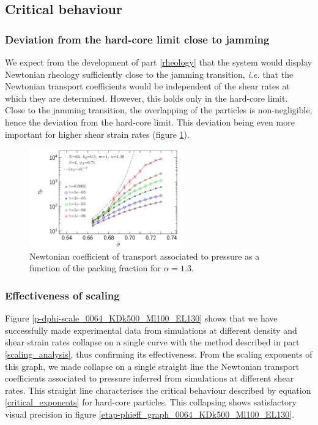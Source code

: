 \documentclass[class=report, float=false, crop=false]{standalone}
\begin{document}
\subsection{Critical behaviour}

\subsubsection{Deviation from the hard-core limit close to jamming}
\label{deviation_hard-core_limit}

We expect from the development of part \ref{rheology} that the system would display Newtonian rheology sufficiently close to the jamming transition, \textit{i.e.} that the Newtonian transport coefficients would be independent of the shear rates at which they are determined. However, this holds only in the hard-core limit.\\

Close to the jamming transition, the overlapping of the particles is non-negligible, hence the deviation from the hard-core limit. This deviation being even more important for higher shear strain rates (figure \ref{etap-phi_0064_KDk500_Ml100_EL130}).

\begin{figure}[h!]
\centering
\includegraphics[width=0.6\textwidth]{figures/figs/etap-phi_0064_KDk500_Ml100_EL130}
\caption{Newtonian coefficient of transport associated to pressure as a function of the packing fraction for $\alpha=1.3$.}
\label{etap-phi_0064_KDk500_Ml100_EL130}
\end{figure}

\subsubsection{Effectiveness of scaling}

Figure \ref{p-dphi-scale_0064_KDk500_Ml100_EL130} shows that we have successfully made experimental data from simulations at different density and shear strain rates collapse on a single curve with the method described in part \ref{scaling_analysis}, thus confirming its effectiveness. From the scaling exponents of this graph, we made collapse on a single straight line the Newtonian transport coefficients associated to pressure inferred from simulations at different shear rates. This straight line characterises the critical behaviour described by equation \ref{critical_exponents} for hard-core particles. This collapsing shows satisfactory visual precision in figure \ref{etap-phieff_graph_0064_KDk500_Ml100_EL130}.\\
\end{document}
